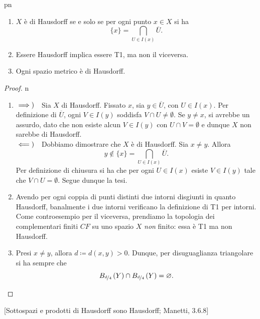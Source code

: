 \begin{remark}{pn}~{}
	\begin{enumerate}
		\item $X$ è di Hausdorff se e solo se per ogni punto $x\in X$ si ha
		\begin{equation*}
			\{x\}=\bigcap_{U\in I\left(x\right)}\overline{U}.
		\end{equation*}
	\item Essere Hausdorff implica essere T1, ma non il viceversa.
	\item Ogni spazio metrico è di Hausdorff.
	\end{enumerate}
\end{remark}
\begin{proof}{n}~{}
\begin{enumerate}[label=\Roman*]
\item $\rightimplies$Sia $X$ di Hausdorff. Fissato $x$, sia $y\in\overline{U}$, con $U\in I\left(x\right)$. Per definizione di $\overline{U}$, ogni $V\in I\left(y\right)$ soddisfa $V\cap U\neq\emptyset$. Se $y \neq x$, si avrebbe un assurdo, dato che non esiste alcun $V\in I\left(y\right)$ con $U\cap V=\emptyset$ e dunque $X$ non sarebbe di Hausdorff.\\
$\leftimplies$Dobbiamo dimostrare che $X$ è di Hausdorff. Sia $x\neq y$. Allora \begin{equation}
	y\notin\{x\}=\bigcap_{U\in I\left(x\right)}\overline{U}.
\end{equation}
Per definizione di chiusura si ha che per ogni $U\in I\left(x\right)$ esiste $V\in I\left(y\right)$ tale che $V\cap U=\emptyset$. Segue dunque la tesi.
\item Avendo per ogni coppia di punti distinti due intorni disgiunti in quanto Hausdorff, banalmente i due intorni verificano la definizione di T1 per intorni. Come controesempio per il viceversa, prendiamo la topologia dei complementari finiti $CF$ su uno spazio $X$ \textit{non} finito: essa è T1 ma non Hausdorff.
\item Presi $x\neq y$, allora $d\coloneqq d(x,y)>0$. Dunque, per disuguaglianza triangolare si ha sempre che
\begin{equation*}
B_{\nicefrac{d}{4}}\left(Y\right)\cap B_{\nicefrac{d}{4}}\left(Y\right)=\emptyset.\qedhere
\end{equation*}
\end{enumerate}
\end{proof}
\begin{proposition}{}[Sottospazi e prodotti di Hausdorff sono Hausdorff; Manetti, 3.6.8]\label{prodottihause}
\end{proposition}
